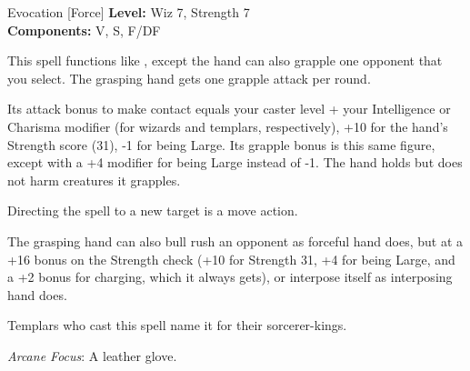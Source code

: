 {Evocation [Force]}
{
	\textbf{Level:}
	Wiz 7, Strength 7\\
	\textbf{Components:}
	V, S, F/DF\\
}
{
	This spell functions like , except the hand can also grapple one opponent that you select. The grasping hand gets one grapple attack per round.

	Its attack bonus to make contact equals your caster level + your Intelligence or Charisma modifier (for wizards and templars, respectively), +10 for the hand's Strength score (31), -1 for being Large. Its grapple bonus is this same figure, except with a +4 modifier for being Large instead of -1. The hand holds but does not harm creatures it grapples.

	Directing the spell to a new target is a move action.

	The grasping hand can also bull rush an opponent as forceful hand does, but at a +16 bonus on the Strength check (+10 for Strength 31, +4 for being Large, and a +2 bonus for charging, which it always gets), or interpose itself as interposing hand does.

	Templars who cast this spell name it for their sorcerer-kings.

	\textit{Arcane Focus}:
	A leather glove.

}
